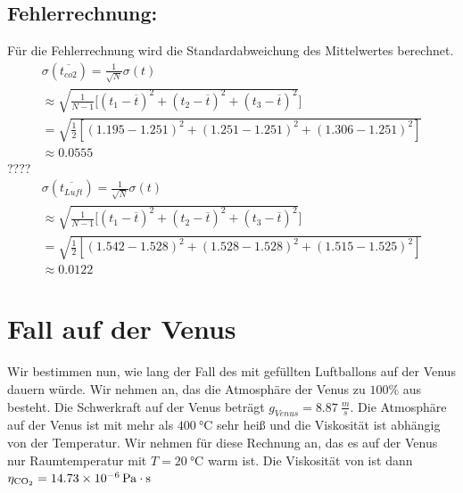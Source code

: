 \documentclass{article}
\begin{document}
        \subsection*{Fehlerrechnung:}
        Für die Fehlerrechnung wird die Standardabweichung des Mittelwertes berechnet.
        \begin{equation}
            \begin{gathered}
                \sigma(\overline{t_{co2}})= \frac{1}{\sqrt{N}} \sigma(t) \\
                \approx \sqrt{\frac{1}{N-1} [(t_1-\overline{t})^2 + (t_2-\overline{t})^2 + (t_3-\overline{t})^2} ] \\
                = \sqrt{ \frac{1}{2} [ (1.195-1.251)^2 + (1.251-1.251)^2 + (1.306-1.251)^2 ] } \\
                \approx 0.0555
            \end{gathered}
        \end{equation}
        ????
        \begin{equation}
            \begin{gathered}
                \sigma(\overline{t_{Luft}})= \frac{1}{\sqrt{N}} \sigma(t) \\
                \approx \sqrt{ \frac{1}{N-1} [ (t_1-\overline{t})^2 + (t_2-\overline{t})^2 + (t_3-\overline{t})^2 } ] \\
                = \sqrt{ \frac{1}{2} [ (1.542-1.528)^2 + (1.528-1.528)^2 + (1.515-1.525)^2 ] } \\
                \approx 0.0122
            \end{gathered}
        \end{equation}

        
    \section{Fall auf der Venus}
        Wir bestimmen nun, wie lang der Fall des mit  gefüllten Luftballons auf der Venus dauern würde. Wir nehmen an,
        das die Atmosphäre der Venus zu \( 100\% \) aus  besteht. Die Schwerkraft auf der Venus beträgt \(g_{Venus} = \SI{8.87}{\frac{m}{s}}\).
        Die Atmosphäre auf der Venus ist mit mehr als \(\SI{400}{\celsius}\) sehr heiß und die Viskosität ist abhängig von der Temperatur.
        Wir nehmen für diese Rechnung an, das es auf der Venus nur Raumtemperatur mit \(T = \SI{20}{\celsius}\) warm ist.
        Die Viskosität von  ist dann \( \eta_{\ce{CO2}} = \SI{14.73e-6}{\pascal\cdot\second} \)
\end{document}
